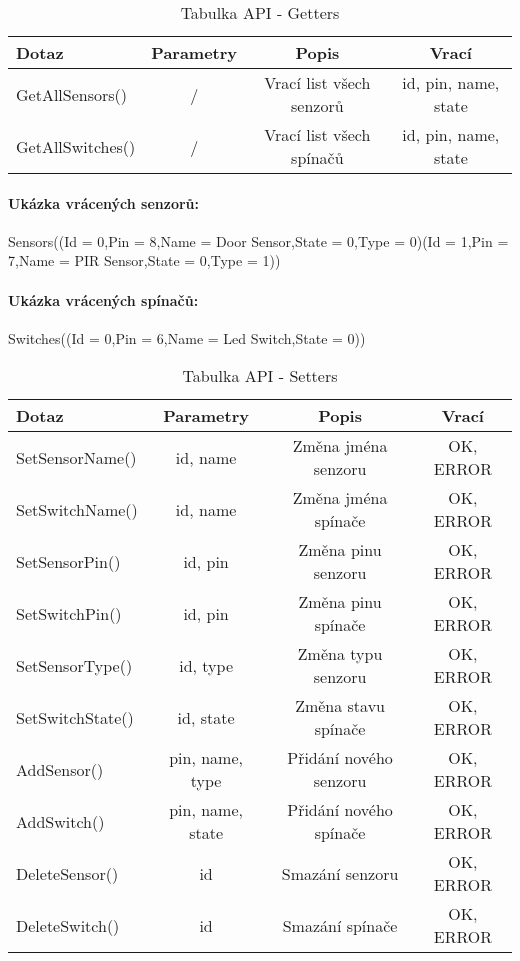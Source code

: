 \documentclass[FM,MP]{tulthesis}  %
\begin{document}
\renewcommand{\arraystretch}{1.5}
\begin{table}[H]
\begin{center}
\begin{tabular}{| l | c | c| c |}
\hline
Dotaz & Parametry & Popis & Vrací\\
\hline
\hline
GetAllSensors() & / & Vrací list všech senzorů & id, pin, name, state \\
\hline
GetAllSwitches() & / & Vrací list všech spínačů & id, pin, name, state \\
\hline
\end{tabular}
\end{center}
\caption{Tabulka API - Getters}
\end{table}

\paragraph{Ukázka vrácených senzorů:}
\begin{center}
Sensors((Id = 0,Pin = 8,Name = Door Sensor,State = 0,Type = 0)(Id = 1,Pin = 7,Name = PIR Sensor,State = 0,Type = 1))
\end{center} 

\paragraph{Ukázka vrácených spínačů:}
\begin{center}
Switches((Id = 0,Pin = 6,Name = Led Switch,State = 0))
\end{center} 

\renewcommand{\arraystretch}{1.5}
\begin{table}[H]
\begin{center}
\begin{tabular}{| l | c | c| c |}
\hline
Dotaz & Parametry & Popis & Vrací\\
\hline
\hline
SetSensorName() & id, name & Změna jména senzoru & OK, ERROR \\
\hline
SetSwitchName() & id, name & Změna jména spínače & OK, ERROR \\
\hline
SetSensorPin() & id, pin & Změna pinu senzoru & OK, ERROR \\
\hline
SetSwitchPin() & id, pin & Změna pinu spínače & OK, ERROR \\
\hline
SetSensorType() & id, type & Změna typu senzoru & OK, ERROR \\
\hline
SetSwitchState() & id, state & Změna stavu spínače & OK, ERROR \\
\hline
AddSensor() & pin, name, type & Přidání nového senzoru & OK, ERROR \\
\hline
AddSwitch() & pin, name, state & Přidání nového spínače & OK, ERROR \\
\hline
DeleteSensor() & id & Smazání senzoru & OK, ERROR \\
\hline
DeleteSwitch() & id & Smazání spínače & OK, ERROR \\
\hline
\end{tabular}
\end{center}
\caption{Tabulka API - Setters}
\end{table}
\end{document}
